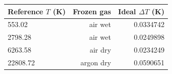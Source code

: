 \begin{tabular}{lrr}\toprule
Reference $T$ (K) & Frozen gas & Ideal $\Delta T$ (K) \\ \midrule
553.02 & air wet & 0.0334742 \\
2798.28 & air wet & 0.0249898 \\
6263.58 & air dry & 0.0234249 \\
22808.72 & argon dry & 0.0590651 \\
\bottomrule\end{tabular}
